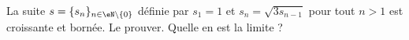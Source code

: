 

\begin{exercice}\label{exoINGE11140035}

	La suite $s=\{ s_n \}_{n\in\eN\setminus\{ 0 \}}$ définie par $s_1=1$ et $s_n=\sqrt{3s_{n-1}}$ pour tout $n>1$ est croissante et bornée. Le prouver. Quelle en est la limite ?

\end{exercice}
